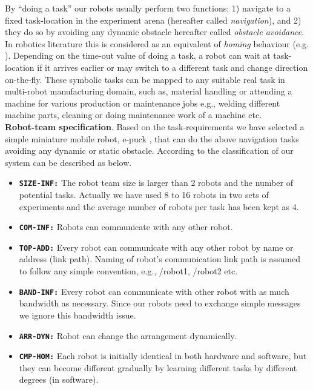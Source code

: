 By ``doing a task'' our robots usually perform two functions: 1) navigate to a fixed task-location in the experiment arena (hereafter called {\em navigation}), and 2) they do so by avoiding any dynamic obstacle {hereafter called {\em obstacle avoidance}}. In robotics literature this is considered as an equivalent of {\em homing} behaviour (e.g. ). Depending on the time-out value of doing a task, a robot can wait at task-location if it arrives earlier or may switch to a different task and change direction on-the-fly. These symbolic tasks can be mapped to any suitable real task in multi-robot manufacturing domain, such as, material handling or attending a machine for various production or maintenance jobs e.g., welding different machine parts, cleaning or doing maintenance work of a machine etc.\\
\textbf{Robot-team specification}. Based on the task-requirements we have selected a simple miniature mobile robot, e-puck \cite{Mondada+2009}, that can do the above navigation tasks avoiding any dynamic or static obstacle. According to the classification of \cite{Dudek+1996} our system can be described as below.
\begin{itemize}
\item \texttt{\textbf{SIZE-INF:}} The robot team size is larger than 2 robots and the number of potential tasks. Actually we have used  8 to 16 robots in two sets of experiments and  the average number of robots per task has been kept as 4.
\item \texttt{\textbf{COM-INF:}} Robots can communicate with any other robot.
\item \texttt{\textbf{TOP-ADD:}} Every robot can communicate with any other robot by name or address (link path). Naming of robot's communication link path is assumed to follow any simple convention, e.g., /robot1, /robot2 etc.
\item \texttt{\textbf{BAND-INF:}} Every robot can communicate with other robot with as much bandwidth as necessary. Since our robots need to exchange simple messages we ignore this bandwidth issue.
\item \texttt{\textbf{ARR-DYN:}} Robot can change the arrangement dynamically.
\item \texttt{\textbf{CMP-HOM:}} Each robot is initially identical in both hardware and software, but they can become different gradually by learning different tasks by different degrees (in software).
\end{itemize}
